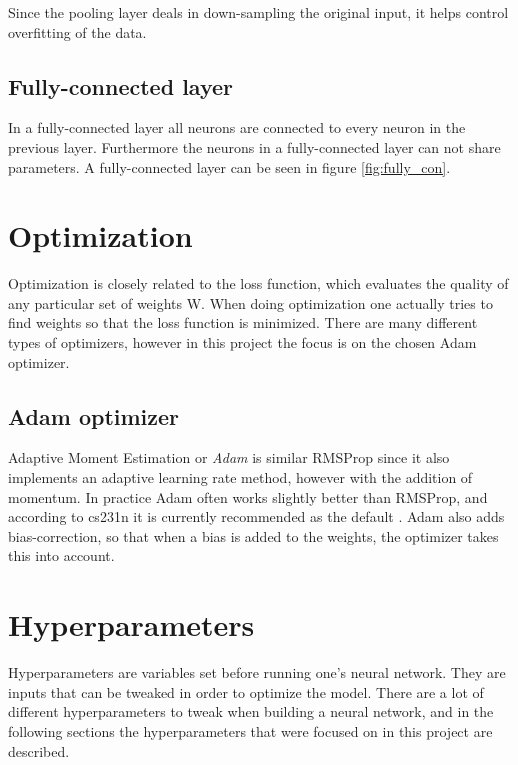 
Since the pooling layer deals in down-sampling the original input, it helps control overfitting of the data. 

\FloatBarrier
\subsection{Fully-connected layer}
In a fully-connected layer all neurons are connected to every neuron in the previous layer. Furthermore the neurons in a fully-connected layer can not share parameters.
A fully-connected layer can be seen in figure \ref{fig:fully_con}.



\section{Optimization}
Optimization is closely related to the loss function, which evaluates the quality of any particular set of weights W. When doing optimization one actually tries to find weights so that the loss function is minimized. There are many different types of optimizers, however in this project the focus is on the chosen Adam optimizer. 

\subsection{Adam optimizer}
Adaptive Moment Estimation or \emph{Adam} is similar RMSProp since it also implements an adaptive learning rate method, however with the addition of momentum. In practice Adam often works slightly better than RMSProp, and according to cs231n it is currently recommended as the default \citep{NN3}. Adam also adds bias-correction, so that when a bias is added to the weights, the optimizer takes this into account. 


\section{Hyperparameters}
Hyperparameters are variables set before running one's neural network. They are inputs that can be tweaked in order to optimize the model. There are a lot of different hyperparameters to tweak when building a neural network, and in the following sections the hyperparameters that were focused on in this project are described. 


